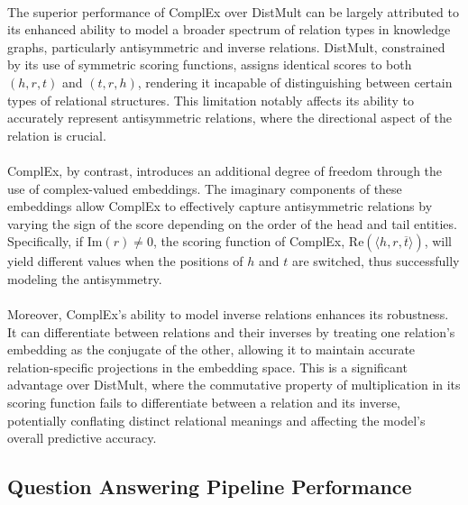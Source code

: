 \documentclass{article}
\begin{document}
\paragraph{}The superior performance of ComplEx over DistMult can be largely attributed to its enhanced ability to model a broader spectrum of relation types in knowledge graphs, particularly antisymmetric and inverse relations. DistMult, constrained by its use of symmetric scoring functions, assigns identical scores to both \((h, r, t)\) and \((t, r, h)\), rendering it incapable of distinguishing between certain types of relational structures. This limitation notably affects its ability to accurately represent antisymmetric relations, where the directional aspect of the relation is crucial. 

\paragraph{}ComplEx, by contrast, introduces an additional degree of freedom through the use of complex-valued embeddings. The imaginary components of these embeddings allow ComplEx to effectively capture antisymmetric relations by varying the sign of the score depending on the order of the head and tail entities. Specifically, if \(\text{Im}(r) \neq 0\), the scoring function of ComplEx, \(\text{Re}(\langle h, r, \overline{t} \rangle)\), will yield different values when the positions of \(h\) and \(t\) are switched, thus successfully modeling the antisymmetry.

\paragraph{}Moreover, ComplEx's ability to model inverse relations enhances its robustness. It can differentiate between relations and their inverses by treating one relation's embedding as the conjugate of the other, allowing it to maintain accurate relation-specific projections in the embedding space. This is a significant advantage over DistMult, where the commutative property of multiplication in its scoring function fails to differentiate between a relation and its inverse, potentially conflating distinct relational meanings and affecting the model's overall predictive accuracy. 

\subsection{Question Answering Pipeline Performance}
\end{document}
